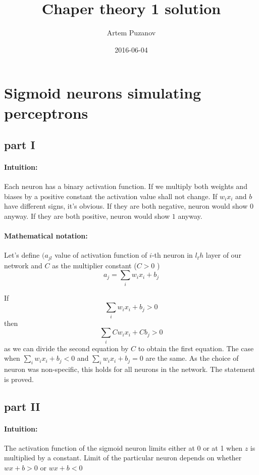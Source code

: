 \documentclass{article}
\title{Chaper theory 1 solution}
\date{2016-06-04}
\author{Artem Puzanov}
\begin{document}
\maketitle
{}
\newpage
{}

\section{Sigmoid neurons simulating perceptrons}
\subsection{part I}
\paragraph{Intuition:} 
Each neuron has a binary activation function. If we multiply both weights and biases by a positive
constant the activation value shall not change. If $w_ix_i$ and $b$ have different signs, it's obvious.
If they are both negative, neuron would show $0$ anyway. If they are both positive, neuron would show
$1$ anyway.
\paragraph{Mathematical notation:} 
Let's define $(a_{jl}$ value of activation function of $i$-th neuron in $l_th$ layer of our network
and $C$ as the multiplier constant ($C > 0$ )
\begin{equation*}
  a_{j} = \sum_{i}w_ix_i + b_j
\end{equation*}

If $$\sum_{i}w_ix_i + b_j > 0$$ then $$\sum_{i}Cw_ix_i + Cb_j > 0$$ as we can divide the second equation by $C$
to obtain the first equation. The case when $\sum_{i}w_ix_i + b_j < 0$ and $\sum_{i}w_ix_i + b_j = 0$ are the same.
As the choice of neuron was non-specific, this holds for all neurons in the network. 
The statement is proved.

\subsection{part II}
\paragraph{Intuition:} 
The activation function of the sigmoid neuron limits either at 0 or at 1 when $z$
is multiplied by a constant. Limit of the particular neuron depends on whether $wx + b > 0$ or $wx + b < 0$
\end{document}
